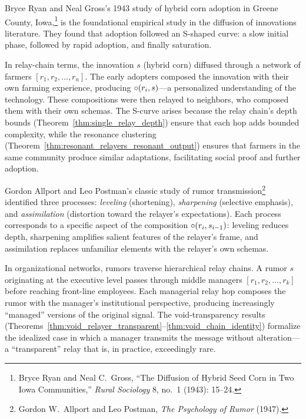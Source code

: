\begin{example}
\label{ex:hybrid-corn}
Bryce Ryan and Neal Gross's 1943 study of hybrid corn adoption in Greene
County, Iowa,\footnote{Bryce Ryan and Neal C.\ Gross, ``The Diffusion of
Hybrid Seed Corn in Two Iowa Communities,'' \textit{Rural Sociology} 8,
no.\ 1 (1943): 15--24.} is the foundational empirical study in the
diffusion of innovations literature.  They found that adoption followed
an S-shaped curve: a slow initial phase, followed by rapid adoption, and
finally saturation.

In relay-chain terms, the innovation $s$ (hybrid corn) diffused through a
network of farmers $[r_1, r_2, \ldots, r_n]$.  The early adopters composed
the innovation with their own farming experience, producing
$\circ(r_i, s)$---a personalized understanding of the technology.  These
compositions were then relayed to neighbors, who composed them with their
own schemas.  The S-curve arises because the relay chain's depth bounds
(Theorem~\ref{thm:single_relay_depth}) ensure that each hop adds bounded
complexity, while the resonance clustering
(Theorem~\ref{thm:resonant_relayers_resonant_output}) ensures that farmers
in the same community produce similar adaptations, facilitating social
proof and further adoption.
\end{example}

\begin{example}
\label{ex:rumor}
Gordon Allport and Leo Postman's classic study of rumor
transmission\footnote{Gordon W.\ Allport and Leo Postman, \textit{The
Psychology of Rumor} (1947).} identified three processes: \emph{leveling}
(shortening), \emph{sharpening} (selective emphasis), and
\emph{assimilation} (distortion toward the relayer's expectations).  Each
process corresponds to a specific aspect of the composition
$\circ(r_i, s_{i-1})$: leveling reduces depth, sharpening amplifies
salient features of the relayer's frame, and assimilation replaces
unfamiliar elements with the relayer's own schemas.

In organizational networks, rumors traverse hierarchical relay chains.
A rumor $s$ originating at the executive level passes through middle
managers $[r_1, r_2, \ldots, r_k]$ before reaching front-line employees.
Each managerial relay hop composes the rumor with the manager's
institutional perspective, producing increasingly ``managed'' versions of
the original signal.  The void-transparency results
(Theorems~\ref{thm:void_relayer_transparent}--\ref{thm:void_chain_identity})
formalize the idealized case in which a manager transmits the message
without alteration---a ``transparent'' relay that is, in practice,
exceedingly rare.
\end{example}

